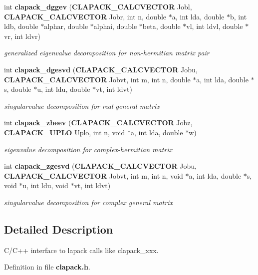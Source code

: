 \begin{DoxyCompactItemize}
int {\bf clapack\-\_\-dggev} ({\bf C\-L\-A\-P\-A\-C\-K\-\_\-\-C\-A\-L\-C\-V\-E\-C\-T\-O\-R} Jobl, {\bf C\-L\-A\-P\-A\-C\-K\-\_\-\-C\-A\-L\-C\-V\-E\-C\-T\-O\-R} Jobr, int n, double $\ast$a, int lda, double $\ast$b, int ldb, double $\ast$alphar, double $\ast$alphai, double $\ast$beta, double $\ast$vl, int ldvl, double $\ast$vr, int ldvr)
\begin{DoxyCompactList}\small\item\em generalized eigenvalue decomposition for non-\/hermitian matrix pair \end{DoxyCompactList}\item 
int {\bf clapack\-\_\-dgesvd} ({\bf C\-L\-A\-P\-A\-C\-K\-\_\-\-C\-A\-L\-C\-V\-E\-C\-T\-O\-R} Jobu, {\bf C\-L\-A\-P\-A\-C\-K\-\_\-\-C\-A\-L\-C\-V\-E\-C\-T\-O\-R} Jobvt, int m, int n, double $\ast$a, int lda, double $\ast$s, double $\ast$u, int ldu, double $\ast$vt, int ldvt)
\begin{DoxyCompactList}\small\item\em singularvalue decomposition for real general matrix \end{DoxyCompactList}\item 
int {\bf clapack\-\_\-zheev} ({\bf C\-L\-A\-P\-A\-C\-K\-\_\-\-C\-A\-L\-C\-V\-E\-C\-T\-O\-R} Jobz, {\bf C\-L\-A\-P\-A\-C\-K\-\_\-\-U\-P\-L\-O} Uplo, int n, void $\ast$a, int lda, double $\ast$w)
\begin{DoxyCompactList}\small\item\em eigenvalue decomposition for complex-\/hermitian matrix \end{DoxyCompactList}\item 
int {\bf clapack\-\_\-zgesvd} ({\bf C\-L\-A\-P\-A\-C\-K\-\_\-\-C\-A\-L\-C\-V\-E\-C\-T\-O\-R} Jobu, {\bf C\-L\-A\-P\-A\-C\-K\-\_\-\-C\-A\-L\-C\-V\-E\-C\-T\-O\-R} Jobvt, int m, int n, void $\ast$a, int lda, double $\ast$s, void $\ast$u, int ldu, void $\ast$vt, int ldvt)
\begin{DoxyCompactList}\small\item\em singularvalue decomposition for complex general matrix \end{DoxyCompactList}\end{DoxyCompactItemize}


\subsection{Detailed Description}
C/\-C++ interface to lapack calls like clapack\-\_\-xxx. 

Definition in file {\bf clapack.\-h}.



